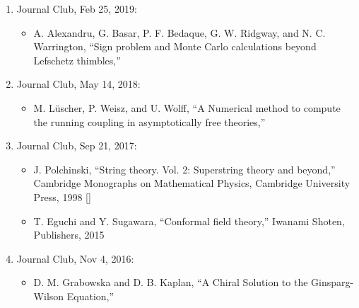 \begin{enumerate}
 \item Journal Club, Feb 25, 2019:
       \begin{itemize}
	\item A. Alexandru, G. Basar, P. F. Bedaque, G. W. Ridgway, and N. C. Warrington,
	      ``Sign problem and Monte Carlo calculations beyond Lefschetz thimbles,''
       \end{itemize}
 \item Journal Club, May 14, 2018:
       \begin{itemize}
	\item  M. L\"uscher, P. Weisz, and U. Wolff,
	       ``A Numerical method to compute the running coupling in asymptotically free theories,''
       \end{itemize}
 \item Journal Club, Sep 21, 2017:
       \begin{itemize}
	\item J. Polchinski,
	      ``String theory. Vol. 2: Superstring theory and beyond,''
	      Cambridge Monographs on Mathematical Physics, Cambridge University Press, 1998
	      []
	\item T. Eguchi and Y. Sugawara,
	      ``Conformal field theory,''
	      Iwanami Shoten, Publishers, 2015
       \end{itemize}
 \item Journal Club, Nov 4, 2016:
       \begin{itemize}
	\item D. M. Grabowska and D. B. Kaplan,
	      ``A Chiral Solution to the Ginsparg-Wilson Equation,''
       \end{itemize}
\end{enumerate}

\renewcommand{\labelenumi}{\arabic{enumi}.}
